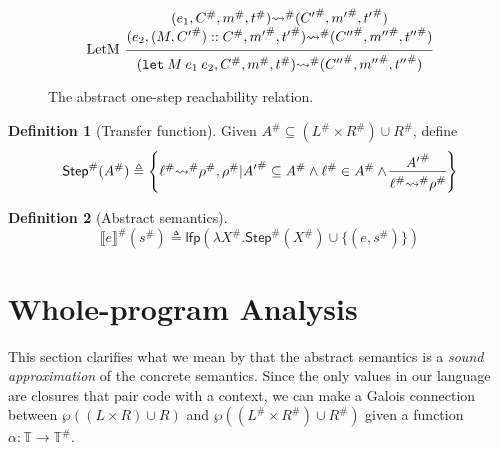 \documentclass[acmsmall,review]{acmart}\settopmatter{printfolios=true,printccs=false,printacmref=false}
\theoremstyle{definition}
\newtheorem{definition}{Definition}[section]
\newcommand*{\cons}{::}
\newcommand*{\A}[1]{{#1}^{\#}}
\newcommand*{\Time}{\mathbb{T}}
\newcommand*{\ATime}{\A{\Time}}
\newcommand*{\mem}{m}
\newcommand*{\sembracket}[1]{\lBrack{#1}\rBrack}
\begin{document}
\begin{figure}[h!]
  \[
    \begin{prooftree}
      \hypo{
        \begin{matrix}
          (e_{1}, \A{C}, \A\mem, \A{t})
          \A\rightsquigarrow
          (\A{C'}, \A{\mem'}, \A{t'}) \\
          (e_{2}, (M, \A{C'})\cons \A{C}, \A{\mem'}, \A{t'})
          \A\rightsquigarrow
          (\A{C''}, \A{\mem''}, \A{t''})
        \end{matrix}
      }
      \infer[left label=LetM]1{
      (\mathtt{let}\:M\:e_{1}\:e_{2}, \A{C}, \A\mem, \A{t})
      \A\rightsquigarrow
      (\A{C''}, \A{\mem''}, \A{t''})
      }
    \end{prooftree}
  \]
  \caption{The abstract one-step reachability relation.}
  \label{fig:absreach}
\end{figure}

\begin{definition}[Transfer function]
  Given $\A{A}\subseteq (\A{L}\times \A{R})\cup\A{R}$, define
  \[
    \A{\mathsf{Step}}(\A{A})\triangleq
    \left\{\A\ell\A\rightsquigarrow\A\rho,\A\rho|
    \A{A'}\subseteq \A{A}\wedge\A{\ell}\in \A{A}\wedge
    \begin{prooftree}[center=true]
      \hypo{\A{A'}}\infer1{\A\ell\A\rightsquigarrow\A\rho}
    \end{prooftree}\right\}
  \]
\end{definition}
\begin{definition}[Abstract semantics]
  \[
    \A{\sembracket{e}}(\A{s})\triangleq\mathsf{lfp}(\lambda \A{X}.\A{\mathsf{Step}}(\A{X})\cup\{(e,\A{s})\})
  \]
\end{definition}

\section{Whole-program Analysis}
This section clarifies what we mean by that the abstract semantics is a \emph{sound approximation} of the concrete semantics.
Since the only values in our language are closures that pair code with a context, we can make a Galois connection between $\wp((L\times R)\cup R)$ and $\wp((\A{L}\times\A{R})\cup\A{R})$ given a function $\alpha:\Time\rightarrow\ATime$.
\end{document}
